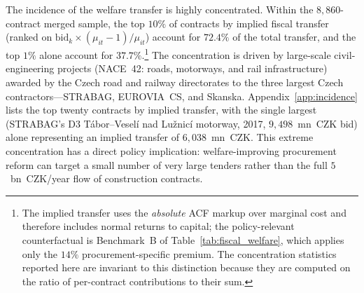 \documentclass[11pt]{article}
\begin{document}
The incidence of the welfare transfer is highly concentrated. Within the $8{,}860$-contract merged sample, the top $10\%$ of contracts by implied fiscal transfer (ranked on $\text{bid}_k \times (\mu_{it}-1)/\mu_{it}$) account for $72.4\%$ of the total transfer, and the top $1\%$ alone account for $37.7\%$.\footnote{The implied transfer uses the \emph{absolute} ACF markup over marginal cost and therefore includes normal returns to capital; the policy-relevant counterfactual is Benchmark~B of Table~\ref{tab:fiscal_welfare}, which applies only the $14\%$ procurement-specific premium. The concentration statistics reported here are invariant to this distinction because they are computed on the ratio of per-contract contributions to their sum.} The concentration is driven by large-scale civil-engineering projects (NACE~42: roads, motorways, and rail infrastructure) awarded by the Czech road and railway directorates to the three largest Czech contractors---STRABAG, EUROVIA~CS, and Skanska. Appendix~\ref{app:incidence} lists the top twenty contracts by implied transfer, with the single largest (STRABAG's D3 Tábor--Veselí nad Lužnicí motorway, 2017, $9{,}498$~mn~CZK bid) alone representing an implied transfer of $6{,}038$~mn~CZK. This extreme concentration has a direct policy implication: welfare-improving procurement reform can target a small number of very large tenders rather than the full $5$~bn~CZK/year flow of construction contracts.
\end{document}
